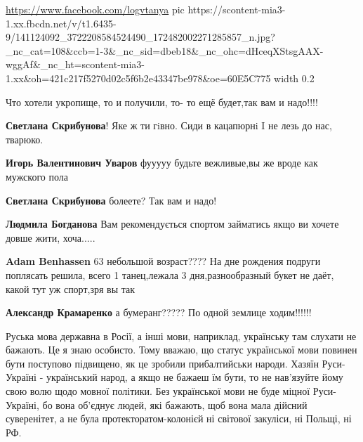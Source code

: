 \url{https://www.facebook.com/logvtanya}
\ifcmt
  pic https://scontent-mia3-1.xx.fbcdn.net/v/t1.6435-9/141124092_3722208584524490_172482002271285857_n.jpg?_nc_cat=108&ccb=1-3&_nc_sid=dbeb18&_nc_ohc=dHceqXStsgAAX-wggAf&_nc_ht=scontent-mia3-1.xx&oh=421c217f5270d02c5f6b2e43347be978&oe=60E5C775
  width 0.2
\fi

Что хотели укропище, то и получили, то- то ещё будет,так вам и надо!!!!

\begin{itemize}
\textbf{Светлана Скрибунова}!
Яке ж ти гiвно. Сиди в кацапюрнi I не лезь до нас, тварюко.

\textbf{Игорь Валентинович Уваров} фууууу будьте вежливые,вы же вроде как мужского пола

\textbf{Светлана Скрибунова} болеете? Так вам и надо!

\textbf{Людмила Богданова} Вам рекомендується спортом займатись якщо ви хочете довше жити, хоча.....

\textbf{Adam Benhassen} 63 небольшой возраст???? На дне рождения подруги
поплясать решила, всего 1 танец,лежала 3 дня,разнообразный букет не даёт, какой
тут уж спорт,зря вы так

\textbf{Александр Крамаренко} а бумеранг????? По одной землице ходим!!!!!!

\end{itemize}


Руська мова державна в Росії, а інші мови, наприклад, українську там слухати не
бажають. Це я знаю особисто. Тому вважаю, що статус української мови повинен
бути поступово підвищено, як це зробили прибалтийськи народи. Хазяїн
Руси-Україні - український народ, а якщо не бажаеш їм бути, то не нав'язуйте
йому свою волю щодо мовної політики. Без української мови не буде міцної
Руси-Україні, бо вона об'єднує людей, які бажають, щоб вона мала дійсний
суверенітет, а не була протекторатом-колонієй ні світової закуліси, ні Польщі,
ні РФ.

